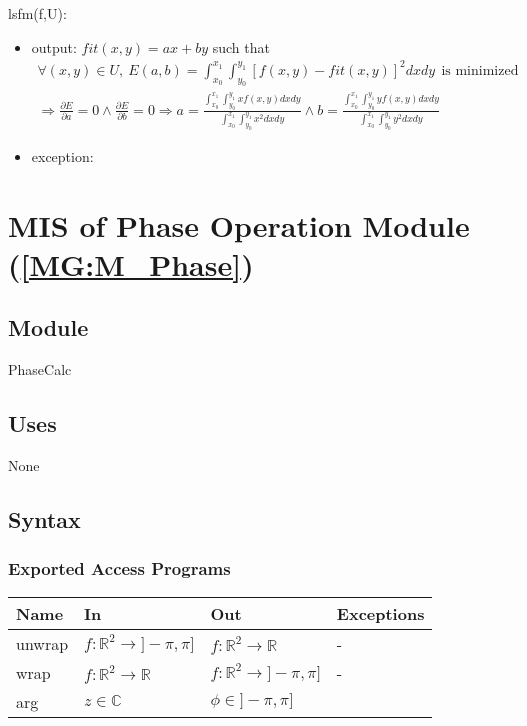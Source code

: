 \documentclass[12pt, titlepage]{article}
\begin{document}
\noindent lsfm(f,U):
\begin{itemize}
\item output: $fit(x,y)=ax + by$ such that
\begin{equation*}
\begin{gathered}
\forall (x,y) \in U, \ E(a,b)=\int_{x_0}^{x_1}\int_{y_0}^{y_1}[f(x,y)-fit(x,y)]^2dxdy \ \ \text{is minimized} \\
\Rightarrow \frac{\partial E}{\partial a} =0 \wedge \frac{\partial E}{\partial b} =0
\Rightarrow a = \frac{\int_{x_0}^{x_1}\int_{y_0}^{y_1}xf(x,y)dxdy}{\int_{x_0}^{x_1}\int_{y_0}^{y_1}x^2dxdy} \wedge  b= \frac{\int_{x_0}^{x_1}\int_{y_0}^{y_1}yf(x,y)dxdy}{\int_{x_0}^{x_1}\int_{y_0}^{y_1}y^2dxdy}
\end{gathered}
\end{equation*}
\item exception:
\end{itemize}


\section{MIS of Phase Operation Module (\texorpdfstring{\cref{MG:M_Phase}}))} \label{MIS_Phase}

\subsection{Module}
PhaseCalc
\subsection{Uses}
None
\subsection{Syntax}

\subsubsection{Exported Access Programs}

\begin{center}
\begin{tabular}{p{2cm} p{4cm} p{4cm} p{2cm}}
\hline
\textbf{Name} & \textbf{In} & \textbf{Out} & \textbf{Exceptions} \\
\hline
unwrap & $f:\mathbb{R}^2\rightarrow]-\pi,\pi]$ & $f:\mathbb{R}^2\rightarrow\mathbb{R}$ & - \\
wrap & $f:\mathbb{R}^2\rightarrow\mathbb{R}$ & $f:\mathbb{R}^2\rightarrow]-\pi,\pi]$ & - \\
arg & $z \in \mathbb{C}$ & $\phi \in ]-\pi,\pi]$ & \\
\hline
\end{tabular}
\end{center}
\end{document}
